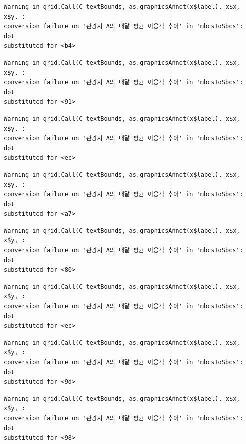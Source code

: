 \documentclass[
  letterpaper,
  DIV=11,
  numbers=noendperiod]{scrreprt}
\begin{document}
\begin{verbatim}
Warning in grid.Call(C_textBounds, as.graphicsAnnot(x$label), x$x, x$y, :
conversion failure on '관광지 A의 매달 평균 이용객 추이' in 'mbcsToSbcs': dot
substituted for <b4>
\end{verbatim}

\begin{verbatim}
Warning in grid.Call(C_textBounds, as.graphicsAnnot(x$label), x$x, x$y, :
conversion failure on '관광지 A의 매달 평균 이용객 추이' in 'mbcsToSbcs': dot
substituted for <91>
\end{verbatim}

\begin{verbatim}
Warning in grid.Call(C_textBounds, as.graphicsAnnot(x$label), x$x, x$y, :
conversion failure on '관광지 A의 매달 평균 이용객 추이' in 'mbcsToSbcs': dot
substituted for <ec>
\end{verbatim}

\begin{verbatim}
Warning in grid.Call(C_textBounds, as.graphicsAnnot(x$label), x$x, x$y, :
conversion failure on '관광지 A의 매달 평균 이용객 추이' in 'mbcsToSbcs': dot
substituted for <a7>
\end{verbatim}

\begin{verbatim}
Warning in grid.Call(C_textBounds, as.graphicsAnnot(x$label), x$x, x$y, :
conversion failure on '관광지 A의 매달 평균 이용객 추이' in 'mbcsToSbcs': dot
substituted for <80>
\end{verbatim}

\begin{verbatim}
Warning in grid.Call(C_textBounds, as.graphicsAnnot(x$label), x$x, x$y, :
conversion failure on '관광지 A의 매달 평균 이용객 추이' in 'mbcsToSbcs': dot
substituted for <ec>
\end{verbatim}

\begin{verbatim}
Warning in grid.Call(C_textBounds, as.graphicsAnnot(x$label), x$x, x$y, :
conversion failure on '관광지 A의 매달 평균 이용객 추이' in 'mbcsToSbcs': dot
substituted for <9d>
\end{verbatim}

\begin{verbatim}
Warning in grid.Call(C_textBounds, as.graphicsAnnot(x$label), x$x, x$y, :
conversion failure on '관광지 A의 매달 평균 이용객 추이' in 'mbcsToSbcs': dot
substituted for <98>
\end{verbatim}
\end{document}
